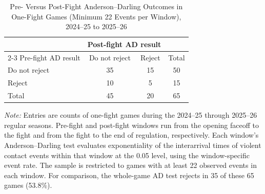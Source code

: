 \begin{table}[htbp]
\centering
\caption{Pre- Versus Post-Fight Anderson--Darling Outcomes in One-Fight Games (Minimum 22 Events per Window), 2024--25 to 2025--26}
\label{tab:one_fight_AD_rejection_min_22_20242025_20252026}
\small
\renewcommand{\arraystretch}{1.15}
\setlength{\tabcolsep}{6pt}

\begin{tabular*}{0.78\textwidth}{@{\extracolsep{\fill}}lccc}
\toprule
 & \multicolumn{2}{c}{Post-fight AD result} & \\
\cmidrule(lr){2-3}
Pre-fight AD result & Do not reject & Reject & Total \\
\midrule
Do not reject & 35 & 15 & 50 \\
Reject & 10 & 5 & 15 \\
\midrule
Total & 45 & 20 & 65 \\
\bottomrule
\end{tabular*}

\vspace{0.4em}
\parbox{0.78\textwidth}{
\footnotesize
\textit{Note:} Entries are counts of one-fight games during the 2024--25 through 2025--26 regular seasons. Pre-fight and post-fight windows run from the opening faceoff to the fight and from the fight to the end of regulation, respectively. Each window's Anderson--Darling test evaluates exponentiality of the interarrival times of violent contact events within that window at the 0.05 level, using the window-specific event rate. The sample is restricted to games with at least 22 observed events in each window. For comparison, the whole-game AD test rejects in 35 of these 65 games (53.8\%).
}
\end{table}
